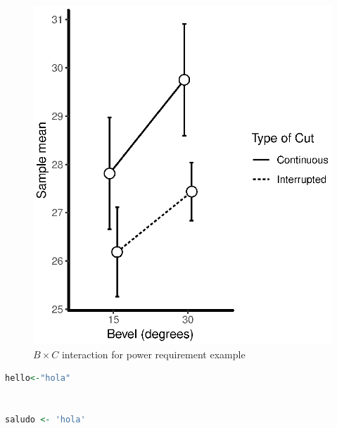 \documentclass{WileySev}
\begin{document}
\begin{figure}
  \includegraphics[width=0.2\linewidth]{Ch1_interaction_plot.eps}
  \centering
  \caption{$B \times C$ interaction for power requirement example}
  \label{fig:ch1_interaction}
\end{figure}

\begin{lstlisting}[language=R]
hello<-"hola"
\end{lstlisting}

\chapter[Single-Factor Experiment]{}

\begin{lstlisting}[language=R]
saludo <- 'hola'
\end{lstlisting}









\end{document}
